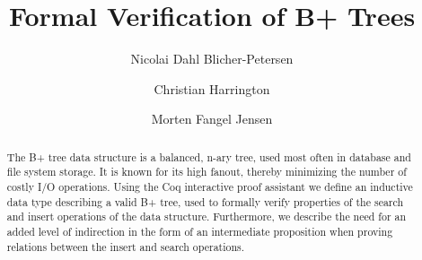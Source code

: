 \documentclass[oribibl]{llncs}
\begin{document}
\mainmatter
\title{Formal Verification of B+ Trees}
\author{Nicolai Dahl Blicher-Petersen \and Christian Harrington \and Morten Fangel Jensen \\
}

\maketitle

\begin{abstract}
The B+ tree data structure is a balanced, n-ary tree, used most often in database and file system storage. It is known for its high fanout, thereby minimizing the number of costly I/O operations. Using the Coq interactive proof assistant we define an inductive data type describing a valid B+ tree, used to formally verify properties of the search and insert operations of the data structure. Furthermore, we describe the need for an added level of indirection in the form of an intermediate proposition when proving relations between the insert and search operations.

\end{abstract}









\newpage

\end{document}
